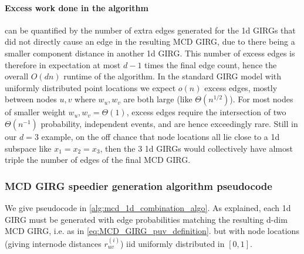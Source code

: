 \paragraph{Excess work done in the algorithm} can be quantified by the number of extra edges generated for the 1d GIRGs that did not directly cause an edge in the resulting MCD GIRG, due to there being a smaller component distance in another 1d GIRG. This number of excess edges is therefore in expectation at most $d-1$ times the final edge count, hence the overall $O(dn)$ runtime of the algorithm. In the standard GIRG model with uniformly distributed point locations we expect $o(n)$ excess edges, mostly between nodes $u,v$ where $w_u, w_v$ are both large (like $\Theta(n^{1/2})$). For most nodes of smaller weight $w_u, w_v = \Theta(1)$, excess edges require the intersection of two $\Theta(n^{-1})$ probability, independent events, and are hence exceedingly rare. Still in our $d=3$ example, on the off chance that node locations all lie close to a 1d subspace like $x_1 = x_2 = x_3$, then the $3$ 1d GIRGs would collectively have almost triple the number of edges of the final MCD GIRG.


\subsubsection{MCD GIRG speedier generation algorithm pseudocode}
We give pseudocode in \cref{alg:mcd_1d_combination_algo}. As explained, each 1d GIRG must be generated with edge probabilities matching the resulting d-dim MCD GIRG, i.e. as in \cref{eq:MCD_GIRG_puv_definition}.
but with node locations (giving internode distances $r^{(i)}_{uv}$) iid uniformly distributed in $[0,1]$.


